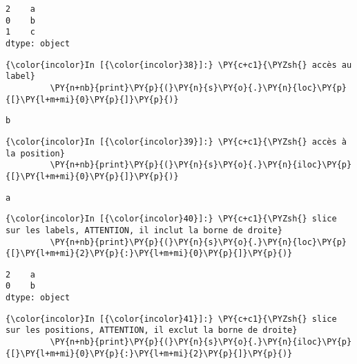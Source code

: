     \begin{Verbatim}[commandchars=\\\{\}]
2    a
0    b
1    c
dtype: object

    \end{Verbatim}

    \begin{Verbatim}[commandchars=\\\{\}]
{\color{incolor}In [{\color{incolor}38}]:} \PY{c+c1}{\PYZsh{} accès au label}
         \PY{n+nb}{print}\PY{p}{(}\PY{n}{s}\PY{o}{.}\PY{n}{loc}\PY{p}{[}\PY{l+m+mi}{0}\PY{p}{]}\PY{p}{)}
\end{Verbatim}


    \begin{Verbatim}[commandchars=\\\{\}]
b

    \end{Verbatim}

    \begin{Verbatim}[commandchars=\\\{\}]
{\color{incolor}In [{\color{incolor}39}]:} \PY{c+c1}{\PYZsh{} accès à la position}
         \PY{n+nb}{print}\PY{p}{(}\PY{n}{s}\PY{o}{.}\PY{n}{iloc}\PY{p}{[}\PY{l+m+mi}{0}\PY{p}{]}\PY{p}{)}
\end{Verbatim}


    \begin{Verbatim}[commandchars=\\\{\}]
a

    \end{Verbatim}

    \begin{Verbatim}[commandchars=\\\{\}]
{\color{incolor}In [{\color{incolor}40}]:} \PY{c+c1}{\PYZsh{} slice sur les labels, ATTENTION, il inclut la borne de droite}
         \PY{n+nb}{print}\PY{p}{(}\PY{n}{s}\PY{o}{.}\PY{n}{loc}\PY{p}{[}\PY{l+m+mi}{2}\PY{p}{:}\PY{l+m+mi}{0}\PY{p}{]}\PY{p}{)}
\end{Verbatim}


    \begin{Verbatim}[commandchars=\\\{\}]
2    a
0    b
dtype: object

    \end{Verbatim}

    \begin{Verbatim}[commandchars=\\\{\}]
{\color{incolor}In [{\color{incolor}41}]:} \PY{c+c1}{\PYZsh{} slice sur les positions, ATTENTION, il exclut la borne de droite}
         \PY{n+nb}{print}\PY{p}{(}\PY{n}{s}\PY{o}{.}\PY{n}{iloc}\PY{p}{[}\PY{l+m+mi}{0}\PY{p}{:}\PY{l+m+mi}{2}\PY{p}{]}\PY{p}{)}
\end{Verbatim}


